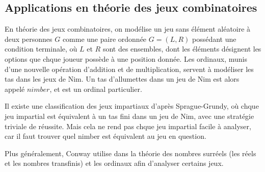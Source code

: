\documentclass{article}
\theoremstyle{definition}
\theoremstyle{plain}
\theoremstyle{plain}
\theoremstyle{plain}
\theoremstyle{plain}
\theoremstyle{plain}
\begin{document}
\subsection{Applications en théorie des jeux combinatoires}

\par En théorie des jeux combinatoires, on modélise un jeu sans élément aléatoire à deux personnes \( G \) comme une paire ordonnée \( G=(L,R) \) possédant une condition terminale, où \( L \) et \( R \) sont des ensembles, dont les éléments désignent les options que chque joueur possède à une position donnée. Les ordinaux, munis d'une nouvelle opération d'addition et de multiplication, servent à modéliser les tas dans les jeux de Nim. Un tas d'allumettes dans un jeu de Nim est alors appelé \( nimber \), et est un ordinal particulier. 

Il existe une classification des jeux impartiaux d'après Sprague-Grundy, où chque jeu impartial est équivalent à un tas fini dans un jeu de Nim, avec une stratégie triviale de réussite. Mais cela ne rend pas chque jeu impartial facile à analyser, car il faut trouver quel nimber est équivalent au jeu en question. \cite{schleicher2005introduction}

Plus généralement, Conway utilise dans \cite{conway2000onag} la théorie des nombres surréels (les réels et les nombres transfinis) et les ordinaux afin d'analyser certains jeux. 
\clearpage
\printbibliography[heading=bibintoc]
\end{document}
